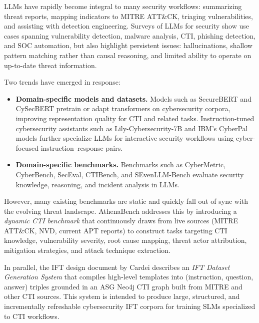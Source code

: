 \documentclass[10pt]{article}
\begin{document}
LLMs have rapidly become integral to many security workflows: summarizing threat reports, mapping indicators to MITRE ATT\&CK, triaging vulnerabilities, and assisting with detection engineering. Surveys of LLMs for security show use cases spanning vulnerability detection, malware analysis, CTI, phishing detection, and SOC automation, but also highlight persistent issues: hallucinations, shallow pattern matching rather than causal reasoning, and limited ability to operate on up-to-date threat information.\cite{levi2024cyberpal,liu2024cyberbench}

Two trends have emerged in response:

\begin{itemize}[leftmargin=*]
  \item \textbf{Domain-specific models and datasets.} Models such as SecureBERT and CySecBERT pretrain or adapt transformers on cybersecurity corpora, improving representation quality for CTI and related tasks. Instruction-tuned cybersecurity assistants such as Lily-Cybersecurity-7B and IBM’s CyberPal models further specialize LLMs for interactive security workflows using cyber-focused instruction--response pairs.\cite{levi2024cyberpal}
  \item \textbf{Domain-specific benchmarks.} Benchmarks such as CyberMetric, CyberBench, SecEval, CTIBench, and SEvenLLM-Bench evaluate security knowledge, reasoning, and incident analysis in LLMs.\cite{alam2024ctibench,ji2024sevenllm,liu2024cyberbench}
\end{itemize}

However, many existing benchmarks are static and quickly fall out of sync with the evolving threat landscape. AthenaBench addresses this by introducing a \emph{dynamic CTI benchmark} that continuously draws from live sources (MITRE ATT\&CK, NVD, current APT reports) to construct tasks targeting CTI knowledge, vulnerability severity, root cause mapping, threat actor attribution, mitigation strategies, and attack technique extraction.\cite{alam2025athenabench}

In parallel, the IFT design document by Cardei describes an \emph{IFT Dataset Generation System} that compiles high-level templates into (instruction, question, answer) triples grounded in an ASG Neo4j CTI graph built from MITRE and other CTI sources.\cite{cardei2025ift} This system is intended to produce large, structured, and incrementally refreshable cybersecurity IFT corpora for training SLMs specialized to CTI workflows.
\end{document}
